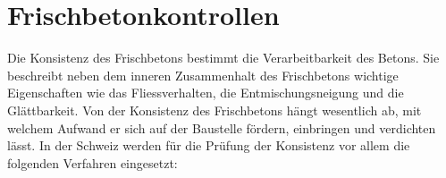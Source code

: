 




\pagestyle{headandfoot}
\firstpageheadrule
\runningheadrule
\firstpageheader{\fontsize{9pt}{2pt}\selectfont\fach}{}{\fontsize{9pt}{2pt}\selectfont\dozent \\ \blattname}
\runningheader{\fontsize{9pt}{2pt}\selectfont\fach}{}{\fontsize{9pt}{2pt}\selectfont\dozent \\ \blattname}

\usepackage{siunitx}


\newcommand{\blattname}{Frischbetonkontrollen}



\section*{\blattname}
Die Konsistenz des Frischbetons bestimmt die Verarbeitbarkeit des Betons. Sie beschreibt neben dem inneren Zusammenhalt des Frischbetons wichtige Eigenschaften wie das Fliessverhalten, die Entmischungsneigung und die Glättbarkeit. Von der Konsistenz des Frischbetons hängt wesentlich ab, mit welchem Aufwand er sich auf der Baustelle fördern, einbringen und verdichten lässt. In der Schweiz werden für die Prüfung der Konsistenz vor allem die folgenden Verfahren eingesetzt:

